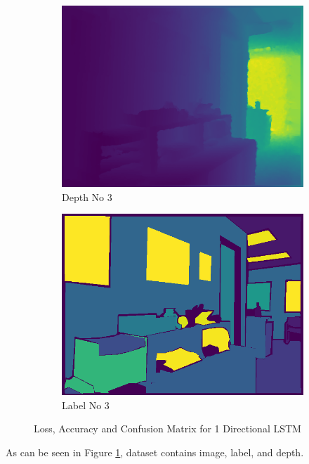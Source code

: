 \documentclass[a4paper, openany]{book}
\begin{document}
\begin{figure}[ht]
\begin{subfigure}[b]{0.3\linewidth}
    \includegraphics[width=\linewidth]{images/depthNo8.png}
    \caption{Depth No 3}
  \end{subfigure}
    \begin{subfigure}[b]{0.3\linewidth}
    \includegraphics[width=\linewidth]{images/labelNo8.png}
    \caption{Label No 3}
  \end{subfigure}
  \caption{Loss, Accuracy and Confusion Matrix for 1 Directional LSTM}
  \label{fig:sample_datas}
\end{figure}

As can be seen in Figure \ref{fig:sample_datas}, dataset contains image, label, and depth.
\end{document}
